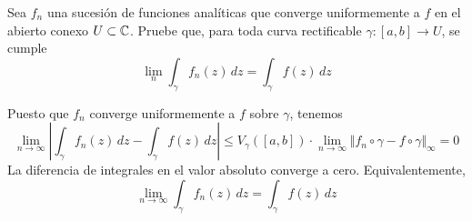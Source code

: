 \begin{exercise}
Sea $f_n$ una sucesión de funciones analíticas que converge uniformemente a $f$ en el abierto conexo $U \subset \mathbb C$. Pruebe que, para toda curva rectificable $\gamma : [a,b] \to U$, se cumple
$$\lim_n \int_\gamma f_n(z) \, dz = \int_\gamma f(z) \, dz$$
\end{exercise}

\begin{solution}
Puesto que $f_n$ converge uniformemente a $f$ sobre $\gamma$, tenemos
$$
\lim_{n \to \infty} \left| \int_\gamma f_n(z) \, dz - \int_\gamma f(z) \, dz \right|
    \le V_\gamma([a,b]) \cdot \lim_{n \to \infty} \Vert f_n \circ \gamma - f \circ \gamma \Vert_\infty
    = 0
$$
La diferencia de integrales en el valor absoluto converge a cero. Equivalentemente,
$$\lim_{n \to \infty} \int_\gamma f_n(z) \, dz = \int_\gamma f(z) \, dz$$
\end{solution}
